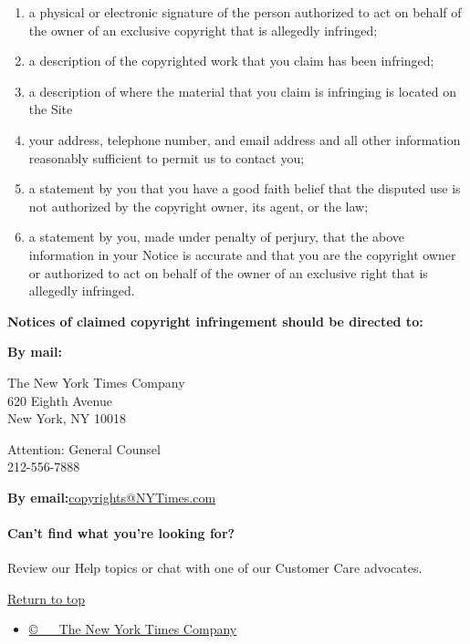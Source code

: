 \begin{enumerate}
\def\labelenumi{\arabic{enumi}.}
\tightlist
\item
   a physical or electronic signature of the person authorized to act on
  behalf of the owner of an exclusive copyright that is allegedly
  infringed;\\
\item
  a description of the copyrighted work that you claim has been
  infringed;
\item
  a description of where the material that you claim is infringing is
  located on the Site
\item
  your address, telephone number, and email address and all other
  information reasonably sufficient to permit us to contact you;
\item
  a statement by you that you have a good faith belief that the disputed
  use is not authorized by the copyright owner, its agent, or the law;
\item
  a statement by you, made under penalty of perjury, that the above
  information in your Notice is accurate and that you are the copyright
  owner or authorized to act on behalf of the owner of an exclusive
  right that is allegedly infringed.
\end{enumerate}

\textbf{Notices of claimed copyright infringement should be directed
to:}

\textbf{By mail:}

The New York Times Company\\
620 Eighth Avenue\\
New York, NY 10018

Attention: General Counsel\\
212-556-7888

\textbf{By
email:}\href{mailto:copyright@NYTimes.com}{copyrights@NYTimes.com}

\hypertarget{cant-find-what-youre-looking-for}{%
\paragraph{Can't find what you're looking
for?}\label{cant-find-what-youre-looking-for}}

Review our Help topics or chat with one of our Customer Care advocates.

\protect\hyperlink{article-container}{Return to top}

\begin{itemize}
\tightlist
\item
  \href{http://www.nytimes3xbfgragh.onion/content/help/rights/copyright/copyright-notice.html}{©~
  ~ The New York Times Company }
\end{itemize}


